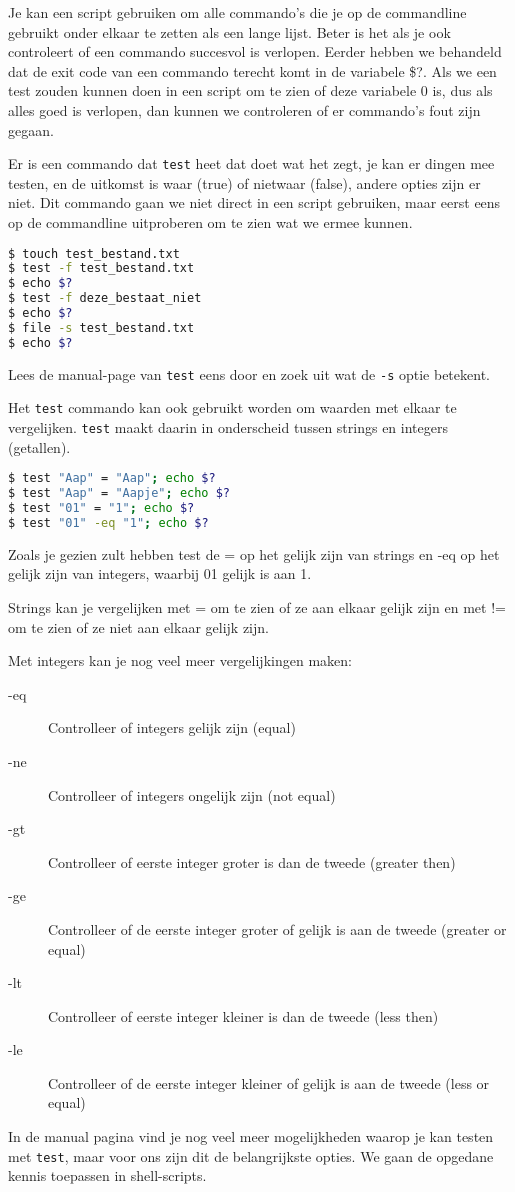 Je kan een script gebruiken om alle commando's die je op de commandline gebruikt onder elkaar te zetten als een lange lijst. Beter is het als je ook controleert of een commando succesvol is verlopen. Eerder hebben we behandeld dat de exit code van een commando terecht komt in de variabele \$?. Als we een test zouden kunnen doen in een script om te zien of deze variabele 0 is, dus als alles goed is verlopen, dan kunnen we controleren of er commando's fout zijn gegaan.

Er is een commando dat \texttt{test} heet dat doet wat het zegt, je kan er dingen mee testen, en de uitkomst is waar (true) of nietwaar (false), andere opties zijn er niet. Dit commando gaan we niet direct in een script gebruiken, maar eerst eens op de commandline uitproberen om te zien wat we ermee kunnen.
\begin{lstlisting}[language=bash]
$ touch test_bestand.txt
$ test -f test_bestand.txt
$ echo $?
$ test -f deze_bestaat_niet
$ echo $?
$ file -s test_bestand.txt
$ echo $?
\end{lstlisting}
Lees de manual-page van \texttt{test} eens door en zoek uit wat de \texttt{-s} optie betekent.

Het \texttt{test} commando kan ook gebruikt worden om waarden met elkaar te vergelijken. \texttt{test} maakt daarin in onderscheid tussen strings en integers (getallen).
\begin{lstlisting}[language=bash]
$ test "Aap" = "Aap"; echo $?
$ test "Aap" = "Aapje"; echo $?
$ test "01" = "1"; echo $?
$ test "01" -eq "1"; echo $?
\end{lstlisting}
Zoals je gezien zult hebben test de = op het gelijk zijn van strings en -eq op het gelijk zijn van integers, waarbij 01 gelijk is aan 1.

Strings kan je vergelijken met = om te zien of ze aan elkaar gelijk zijn en met != om te zien of ze niet aan elkaar gelijk zijn.

Met integers kan je nog veel meer vergelijkingen maken:
\begin{description}
	\item[-eq] Controlleer of integers gelijk zijn (equal)
	\item[-ne] Controlleer of integers ongelijk zijn (not equal)
	\item[-gt] Controlleer of eerste integer groter is dan de tweede (greater then)
	\item[-ge] Controlleer of de eerste integer groter of gelijk is aan de tweede (greater or equal)
	\item[-lt] Controlleer of eerste integer kleiner is dan de tweede (less then)
	\item[-le] Controlleer of de eerste integer kleiner of gelijk is aan de tweede (less or equal)
\end{description}
In de manual pagina vind je nog veel meer mogelijkheden waarop je kan testen met \texttt{test}, maar voor ons zijn dit de belangrijkste opties. We gaan de opgedane kennis toepassen in shell-scripts.

